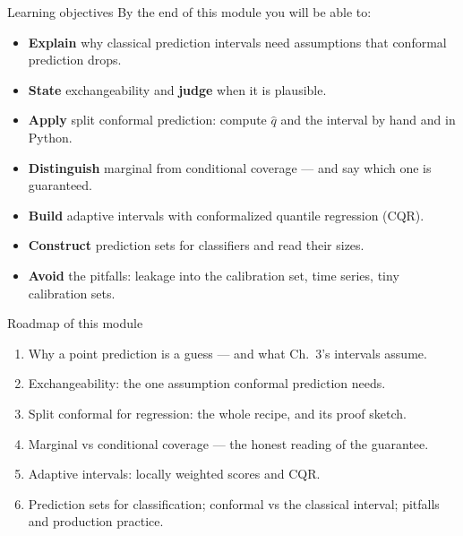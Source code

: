 \documentclass[aspectratio=169,11pt]{beamer}
\begin{document}
\begin{frame}{Learning objectives}
  By the end of this module you will be able to:
  \begin{itemize}
    \item \textbf{Explain} why classical prediction intervals need assumptions that
          conformal prediction drops.
    \item \textbf{State} exchangeability and \textbf{judge} when it is plausible.
    \item \textbf{Apply} split conformal prediction: compute $\hat q$ and the interval
          by hand and in Python.
    \item \textbf{Distinguish} marginal from conditional coverage --- and say which one
          is guaranteed.
    \item \textbf{Build} adaptive intervals with conformalized quantile regression (CQR).
    \item \textbf{Construct} prediction sets for classifiers and read their sizes.
    \item \textbf{Avoid} the pitfalls: leakage into the calibration set, time series,
          tiny calibration sets.
  \end{itemize}
\end{frame}

\begin{frame}{Roadmap of this module}
  \begin{takeaway}
    \begin{enumerate}
      \item Why a point prediction is a guess --- and what Ch.\ 3's intervals assume.
      \item Exchangeability: the one assumption conformal prediction needs.
      \item Split conformal for regression: the whole recipe, and its proof sketch.
      \item Marginal vs conditional coverage --- the honest reading of the guarantee.
      \item Adaptive intervals: locally weighted scores and CQR.
      \item Prediction sets for classification; conformal vs the classical interval;
            pitfalls and production practice.
    \end{enumerate}
  \end{takeaway}
\end{frame}


\end{document}
